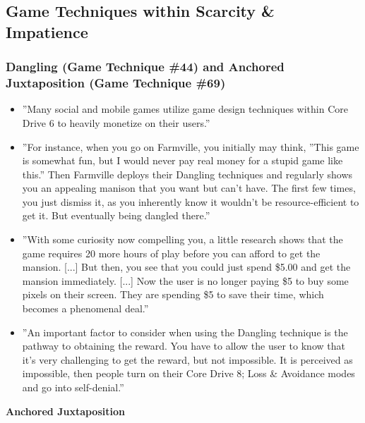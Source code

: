 \subsection{Game Techniques within Scarcity \& Impatience}
\subsubsection{Dangling (Game Technique \#44) and Anchored Juxtaposition (Game Technique \#69)}
    \begin{itemize}
        \item ''Many social and mobile games utilize game design techniques within Core Drive 6 to heavily monetize on their users.''
        \item ''For instance, when you go on Farmville, you initially may think, ''This game is somewhat fun, but I would never pay real money for a stupid game like this.'' Then Farmville deploys their Dangling techniques and regularly shows you an appealing manison that you want but can't have. The first few times, you just dismiss it, as you inherently know it wouldn't be resource-efficient to get it. But eventually being dangled there.''
        \item ''With some curiosity now compelling you, a little research shows that the game requires 20 more hours of play before you can afford to get the mansion. [...] But then, you see that you could just spend \$5.00 and get the mansion immediately. [...] Now the user is no longer paying \$5 to buy some pixels on their screen. They are spending \$5 to save their time, which becomes a phenomenal deal.''
        \item ''An important factor to consider  when using the Dangling technique is the pathway to obtaining the reward. You have to allow the user to know that it's very challenging to get the reward, but not impossible. It is perceived as impossible, then people turn on their Core Drive 8; Loss \& Avoidance modes and go into self-denial.''
    \end{itemize}
    \textbf{Anchored Juxtaposition}
